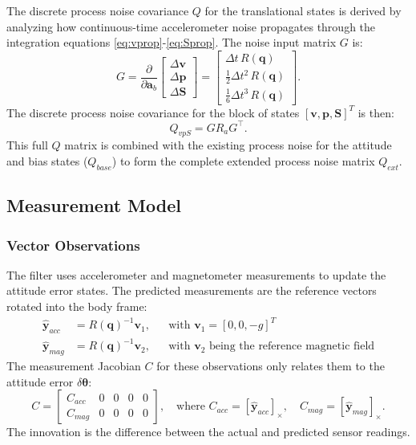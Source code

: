 \documentclass[11pt]{article}
\begin{document}
The discrete process noise covariance $Q$ for the translational states is derived by analyzing how continuous-time accelerometer noise propagates through the integration equations \ref{eq:vprop}-\ref{eq:Sprop}. The noise input matrix $G$ is:
\begin{equation}
G = \frac{\partial}{\partial \bm{a}_b} \begin{bmatrix} \Delta \bm{v} \\ \Delta \bm{p} \\ \Delta \bm{S} \end{bmatrix} = \begin{bmatrix}
\Delta t \, R(\bm{q}) \\
\tfrac{1}{2}\Delta t^2 \, R(\bm{q}) \\
\tfrac{1}{6}\Delta t^3 \, R(\bm{q})
\end{bmatrix}.
\end{equation}
The discrete process noise covariance for the block of states $[\bm{v}, \bm{p}, \bm{S}]^T$ is then:
\begin{equation}
Q_{vpS} = G R_a G^\top.
\end{equation}
This full $Q$ matrix is combined with the existing process noise for the attitude and bias states ($Q_{base}$) to form the complete extended process noise matrix $Q_{ext}$.

\subsection{Measurement Model}
\label{ssec:measurement}

\subsubsection{Vector Observations}
The filter uses accelerometer and magnetometer measurements to update the attitude error states. The predicted measurements are the reference vectors rotated into the body frame:
\begin{align}
\hat{\bm{y}}_{acc} &= R(\bm{q})^{-1} \bm{v}_1, && \text{with } \bm{v}_1 = [0, 0, -g]^T \\
\hat{\bm{y}}_{mag} &= R(\bm{q})^{-1} \bm{v}_2, && \text{with } \bm{v}_2 \text{ being the reference magnetic field}
\end{align}
The measurement Jacobian $C$ for these observations only relates them to the attitude error $\delta \bm{\theta}$:
\begin{equation}
C = \begin{bmatrix}
C_{acc} & 0 & 0 & 0 & 0 \\
C_{mag} & 0 & 0 & 0 & 0
\end{bmatrix}, \quad \text{where } C_{acc} = [\hat{\bm{y}}_{acc}]_\times, \quad C_{mag} = [\hat{\bm{y}}_{mag}]_\times.
\end{equation}
The innovation is the difference between the actual and predicted sensor readings.
\end{document}
